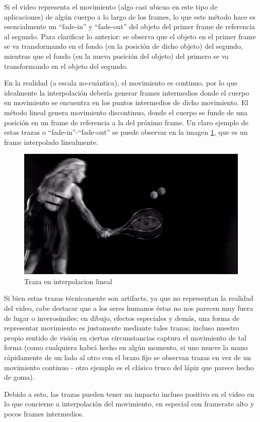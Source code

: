 \par Si el video representa el movimiento (algo casi ubicuo en este tipo de aplicaciones) de alg\'un cuerpo a lo largo de los frames, lo que este m\'etodo hace es esencialmente un ``fade-in'' y ``fade-out'' del objeto del primer frame de referencia al segundo.
Para clarificar lo anterior: se observa que el objeto en el primer frame se va transformando en el fondo (en la posici\'on de dicho objeto) del segundo, mientras que el fondo (en la nueva posici\'on del objeto) del primero se va transformando en el objeto del segundo.
\par En la realidad (a escala no-cu\'antica), el movimiento es continuo, por lo que idealmente la interpolaci\'on deber\'ia generar frames intermedios donde el cuerpo en movimiento se encuentra en los puntos intermedios de dicho movimiento.
El m\'etodo lineal genera movimiento discontinuo, donde el cuerpo se funde de una posici\'on en un frame de referencia a la del pr\'oximo frame.
Un claro ejemplo de estas trazas o ``fade-in''-``fade-out'' se puede observar en la imagen \ref{TenisTrazaLineal}, que es un frame interpolado linealmente.

\FloatBarrier
\begin{figure}[h]
\caption{Traza en interpolacion lineal}
\label{TenisTrazaLineal}
\includegraphics[width=0.9\columnwidth]{imagenes/cualitativos/TTL.png}
\end{figure}
\FloatBarrier

\par Si bien estas trazas t\'ecnicamente son artifacts, ya que no representan la realidad del video, cabe destacar que a los seres humanos \'estas no nos parecen muy fuera de lugar o inveros\'imiles; en dibujo, efectos especiales y dem\'as, una forma de representar movimiento es justamente mediante tales trazas; incluso nuestro propio sentido de visi\'on en ciertas circunstancias captura el movimiento de tal forma (como cualquiera habr\'a hecho en alg\'un momento, si uno mueve la mano r\'apidamente de un lado al otro con el brazo fijo se observan trazas en vez de un movimiento continuo - otro ejemplo es el cl\'asico truco del l\'apiz que parece hecho de goma). 
\par Debido a esto, las trazas pueden tener un impacto incluso positivo en el video en lo que concierne a interpolaci\'on del movimiento, en especial con framerate alto y pocos frames intermedios.

